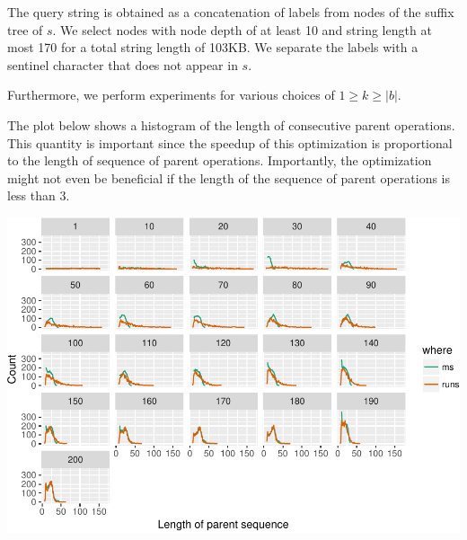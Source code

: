 \documentclass[]{article}
\begin{document}
The query string is obtained as a concatenation of labels from nodes of
the suffix tree of \(s\). We select nodes with node depth of at least 10
and string length at most 170 for a total string length of 103KB. We
separate the labels with a sentinel character that does not appear in
\(s\).

Furthermore, we perform experiments for various choices of
\(1 \geq k \geq |b|\).

The plot below shows a histogram of the length of consecutive parent
operations. This quantity is important since the speedup of this
optimization is proportional to the length of sequence of parent
operations. Importantly, the optimization might not even be beneficial
if the length of the sequence of parent operations is less than 3.

\includegraphics{sea_2018_files/figure-latex/unnamed-chunk-1-1.pdf}
\end{document}

